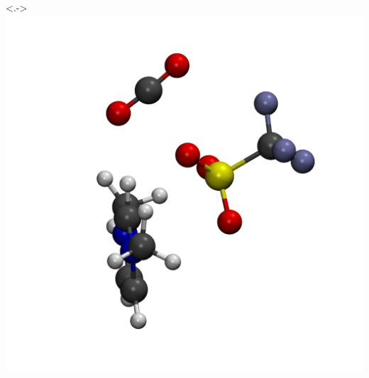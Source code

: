 \documentclass{beamer}
\begin{document}
\begin{frame}
\begin{columns}
    \uncover<.->{\includegraphics[scale=0.09]{./figures/cluster_TfO.png}}
  \end{columns}
\end{frame}
\end{document}
